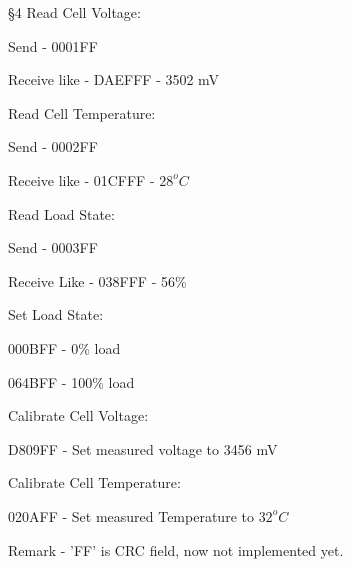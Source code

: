 \documentclass{article}
\begin{document}
\S 4 Read Cell Voltage:

Send - 0001FF

Receive like - DAEFFF - 3502 mV

Read Cell Temperature:

Send - 0002FF

Receive like - 01CFFF - $28 ^{o}C$

Read Load State:

Send - 0003FF

Receive Like - 038FFF - 56\%

Set Load State:

000BFF - 0\% load

064BFF - 100\% load

Calibrate Cell Voltage:

D809FF - Set measured voltage to 3456 mV

Calibrate Cell Temperature:

020AFF - Set measured Temperature to $32 ^{o}C$


Remark - 'FF' is CRC field, now not implemented yet.
\end{document}
